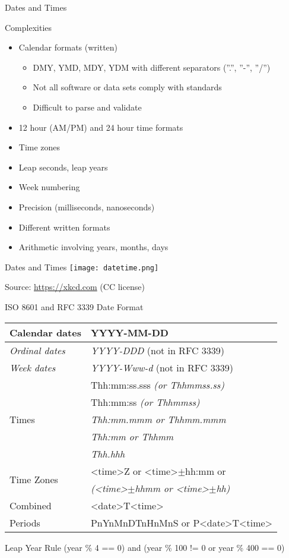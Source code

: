 \documentclass[ignorenonframetext,xcolor=x11names]{beamer}
\begin{document}
\begin{frame}{Dates and Times}
\begin{block}{Complexities}
\begin{itemize}
   \item Calendar formats (written)
   \begin{itemize}
		\item DMY, YMD, MDY, YDM with different separators (''.'', ''-'', ''/'')
		\item Not all software or data sets comply with standards
		\item Difficult to parse and validate
	\end{itemize}
   \item 12 hour (AM/PM) and 24 hour time formats
   \item Time zones
   \item Leap seconds, leap years
   \item Week numbering
   \item Precision (milliseconds, nanoseconds)
   \item Different written formats
   \item Arithmetic involving years, months, days
\end{itemize}
\end{block}
\end{frame}

\begin{frame}{Dates and Times}
\centering
\texttt{[image: datetime.png]} 

\scriptsize Source: \url{https://xkcd.com} (CC license)
\end{frame}

\begin{frame}{ISO 8601 and RFC 3339 Date Format} 
\footnotesize
\renewcommand{\arraystretch}{1.25}

\begin{tabular}{l|l} \hline
	Calendar dates & YYYY-MM-DD  \\ \hline
	\textit{Ordinal dates} & \textit{YYYY-DDD} (not in RFC 3339) \\ \hline
	\textit{Week dates} & \textit{YYYY-Www-d} (not in RFC 3339) \\ \hline
	\multirow{5}{*}{Times} & Thh:mm:ss.sss \textit{(or Thhmmss.ss)} \\
	& Thh:mm:ss \textit{(or Thhmmss)} \\
	& \textit{Thh:mm.mmm or Thhmm.mmm} \\
	& \textit{Thh:mm or Thhmm} \\
	& \textit{Thh.hhh} \\ \hline
	\multirow{2}{*}{Time Zones} & <time>Z or <time>$\pm$hh:mm or \\
	& \textit{(<time>$\pm$hhmm or <time>$\pm$hh)} \\ \hline
	Combined & <date>T<time> \\
	Periods & PnYnMnDTnHnMnS or P<date>T<time>
\end{tabular}
\begin{block}{Leap Year Rule}
(year \% 4 == 0) and (year \% 100 != 0 or year \% 400 == 0)
\end{block}
\end{frame}
\end{document}
